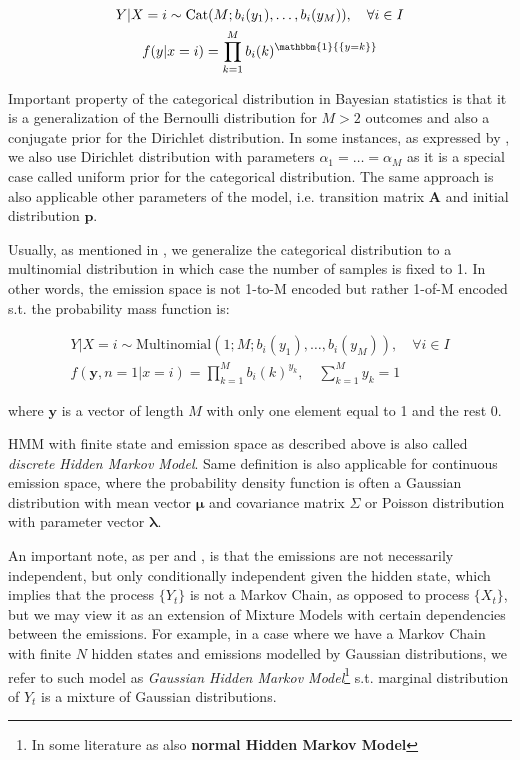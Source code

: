 \begin{gather}
    Y | X = i \sim \text{Cat}(M;b_i(y_1),\ldots,b_i(y_M)), \quad \forall i \in I \\
    f(y|x=i) = \prod\limits_{k=1}^M b_i(k)^{\mathbbm{1}{\{y=k\}}}
\end{gather}
 
Important property of the categorical distribution in Bayesian statistics is that it is a generalization of the Bernoulli distribution for $M > 2$ 
outcomes and also a conjugate prior for the Dirichlet distribution. In some instances, as expressed by \cite{Paisley2009}, we also use Dirichlet distribution with parameters $\alpha_1=\ldots=\alpha_M$ 
as it is a special case called uniform prior for the categorical distribution. The same approach is also applicable other parameters of the model, i.e. 
transition matrix $\textbf{A}$ and initial distribution $\textbf{p}$.

Usually, as mentioned in \cite{Agresti2007}, we generalize the categorical distribution to a multinomial distribution in which case the number of samples is fixed to 1. 
In other words, the emission space is not 1-to-M encoded but rather 1-of-M encoded s.t. the probability mass function is:

\begin{gather}
    Y | X = i \sim \text{Multinomial}(1;M;b_i(y_1),\ldots,b_i(y_M)), \quad \forall i \in I \\
    f(\textbf{y},n=1|x=i) = \prod_{k=1}^M b_i(k)^{y_{k}}, \quad \sum_{k=1}^M y_{k} = 1
\end{gather}

\noindent where $\textbf{y}$ is a vector of length $M$ with only one element equal to 1 and the rest 0. 

HMM with finite state and emission space as described above is also called \textit{discrete Hidden Markov Model}. Same definition is also applicable for continuous emission space, where the probability density function is 
often a Gaussian distribution with mean vector $\mathbf{\mu}$ and covariance matrix $\Sigma$ or Poisson distribution with parameter vector $\boldsymbol{\lambda}$.

An important note, as per \cite{Bishop2006} and \cite{}, is that the emissions are not necessarily independent, but only conditionally independent given the hidden state, which implies that the process $\{Y_t\}$ is not a Markov Chain, as opposed to process $\{X_t\}$,
but we may view it as an extension of Mixture Models with certain dependencies between the emissions. For example, in a case where we have a Markov Chain with finite $N$ hidden states and emissions modelled by Gaussian distributions, 
we refer to such model as \textit{Gaussian Hidden Markov Model}\footnote{In some literature as \cite{Capp2005} also \textbf{normal Hidden Markov Model}} s.t. marginal distribution of $Y_t$ is a mixture of Gaussian distributions.

